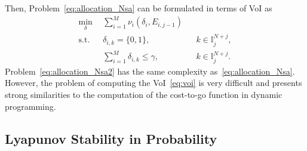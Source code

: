 \documentclass[letterpaper, 10 pt, conference]{ieeeconf}  %
\begin{document}
Then, Problem~\eqref{eq:allocation_Nsa} can be formulated in terms of VoI as
\begin{subequations}
\label{eq:allocation_Nsa2}
\begin{align}
\min_{\delta} \ \ & \sum_{i=1}^{M} \nu_i(\delta_i,E_{i,j-1}) \\
\mathrm{s.t.} \ \ 
& \delta_{i,k} = \{0,1\},&& k\in\mathbb{I}_j^{N+j}, \\
& \sum_{i=1}^{M} \delta_{i,k} \leq \gamma,&& k\in\mathbb{I}_j^{N+j}.
\end{align}
\end{subequations}
Problem~\eqref{eq:allocation_Nsa2} has the same complexity as~\eqref{eq:allocation_Nsa}. However, the problem of computing the VoI~\eqref{eq:voi} is very difficult and presents strong similarities to the computation of the cost-to-go function in dynamic programming. %


\subsection{Lyapunov Stability in Probability}
\end{document}
